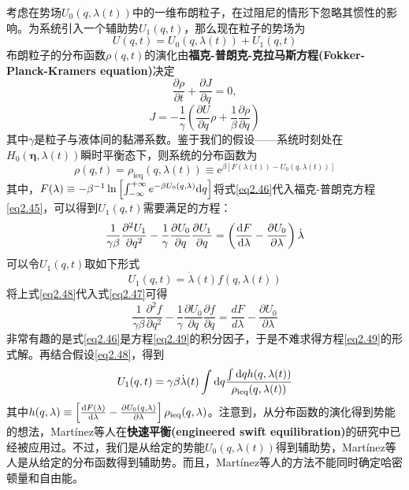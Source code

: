 \qquad 考虑在势场$U_0 (q, \lambda(t))$中的一维布朗粒子，在过阻尼的情形下忽略其惯性的影响。为系统引入一个辅助势$U_1 (q,t)$，那么现在粒子的势场为
\begin{equation}
    U (q,t) = U_0 (q, \lambda(t)) + U_1 (q,t)
    \label{eq2.44}
\end{equation}
布朗粒子的分布函数$\rho (q, t)$的演化由\textbf{福克-普朗克-克拉马斯方程(Fokker-Planck-Kramers equation)}\cite{Gardiner}决定
\begin{equation}
    \frac{\partial \rho}{\partial t} + \frac{\partial J}{\partial q}=0,
    \label{eq2.45}
\end{equation}
\begin{equation}
    J=-\frac{1}{\gamma} \left(\frac{\partial U}{\partial q} \rho+\frac{1}{\beta} \frac{\partial \rho}{\partial q}\right)
    \label{eq2.45.5}
\end{equation}
其中$\gamma$是粒子与液体间的黏滞系数。鉴于我们的假设——系统时刻处在$H_0 (\bm{\eta}, \lambda(t))$瞬时平衡态下，则系统的分布函数为
\begin{equation}
    \rho(q, t)=\rho_{\mathrm{ieq}}(q, \lambda(t)) \equiv \mathrm{e}^{\beta\left[F(\lambda(t))-U_{0}(q, \lambda(t))\right]}
    \label{eq2.46}
\end{equation}
其中，$F(\lambda) \equiv-\beta^{-1} \ln \left[\int_{-\infty}^{+\infty} e^{-\beta U_{0}(q, \lambda)} \mathrm{d} q \right]$将式\eqref{eq2.46}代入福克-普朗克方程\eqref{eq2.45}，可以得到$U_1 (q,t)$需要满足的方程：
\begin{equation}
    \frac{1}{\gamma \beta} \frac{\partial^{2} U_{1}}{\partial q^{2}}-\frac{1}{\gamma} \frac{\partial U_{0}}{\partial q} \frac{\partial U_{1}}{\partial q}=\left(\frac{\mathrm{d} F}{\mathrm{d} \lambda}-\frac{\partial U_{0}}{\partial \lambda}\right) \dot{\lambda}
    \label{eq2.47}
\end{equation}
可以令$ U_{1}(q, t)$取如下形式
\begin{equation}
    U_{1}(q, t)=\dot{\lambda}(t) f(q, \lambda(t))
    \label{eq2.48}
\end{equation}
将上式\eqref{eq2.48}代入式\eqref{eq2.47}可得
\begin{equation}
    \frac{1}{\gamma \beta} \frac{\partial^{2} f}{\partial q^{2}}-\frac{1}{\gamma} \frac{\partial U_{0}}{\partial q} \frac{\partial f}{\partial q}=\frac{d F}{d \lambda}-\frac{\partial U_{0}}{\partial \lambda}
    \label{eq2.49}
\end{equation}
非常有趣的是式\eqref{eq2.46}是方程\eqref{eq2.49}的积分因子，于是不难求得方程\eqref{eq2.49}的形式解。再结合假设\eqref{eq2.48}，得到
\begin{equation}
    U_{1}(q, t)=\gamma \beta \dot{\lambda}(t) \int \mathrm{d} q \frac{\int \mathrm{d} q h(q, \lambda(t))}{\rho_{\mathrm{ieq}}(q, \lambda(t))}
    \label{eq2.50}
\end{equation}
其中$h(q, \lambda) \equiv\left[\frac{\mathrm{d} F(\lambda)}{\mathrm{d} \lambda}-\frac{\partial U_{0}(q, \lambda)}{\partial \lambda}\right] \rho_{\mathrm{ieq}}(q, \lambda)$。注意到，从分布函数的演化得到势能的想法，Martínez等人在\textbf{快速平衡(engineered swift equilibration)}的研究\cite{Martinez2016}中已经被应用过。不过，我们是从给定的势能$U_0 (q,\lambda(t))$得到辅助势，Martínez等人是从给定的分布函数得到辅助势。而且，Martínez等人的方法不能同时确定哈密顿量和自由能。

